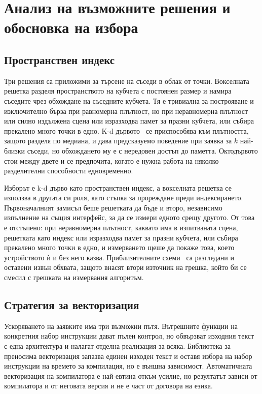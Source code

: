 \section{Анализ на възможните решения и обосновка на избора}
\label{sec:alternatives}

\subsection{Пространствен индекс}

Три решения са приложими за търсене на съседи в облак от точки. Вокселната решетка
разделя пространството на кубчета с постоянен размер и намира съседите чрез обхождане
на съседните кубчета. Тя е тривиална за построяване и изключително бърза при равномерна
плътност, но при неравномерна плътност или силно издължена сцена или изразходва памет
за празни кубчета, или събира прекалено много точки в едно. K-d дървото~\cite{bentley1975kdtree}
се приспособява към плътността, защото разделя по медиана, и дава предсказуемо
поведение при заявка за $k$ най-близки съседи, но обхождането му е с нередовен достъп
до паметта. Октодървото стои между двете и се предпочита, когато е нужна работа на
няколко разделителни способности едновременно.

Изборът е k-d дърво като пространствен индекс, а вокселната решетка се използва в
другата си роля, като стъпка за прореждане преди индексирането. Първоначалният замисъл
беше решетката да бъде и второ, независимо изпълнение на същия интерфейс, за да се измери
едното срещу другото. От това е отстъпено: при неравномерна плътност, каквато има в
изпитваната сцена, решетката като индекс или изразходва памет за празни кубчета, или
събира прекалено много точки в едно, и измерването щеше да покаже това, което устройството
ѝ и без него казва. Приблизителните схеми~\cite{muja2014flann} са разгледани и оставени
извън обхвата, защото внасят втори източник на грешка, който би се смесил с грешката на
измервания алгоритъм.

\subsection{Стратегия за векторизация}

Ускоряването на заявките има три възможни пътя. Вътрешните функции на конкретния набор
инструкции дават пълен контрол, но обвързват изходния текст с една архитектура и налагат
отделна реализация за всяка. Библиотека за преносима векторизация запазва единен изходен
текст и оставя избора на набор инструкции на времето за компилация, но е външна
зависимост. Автоматичната векторизация на компилатора е най-евтина откъм усилие, но
резултатът зависи от компилатора и от неговата версия и не е част от договора на езика.

